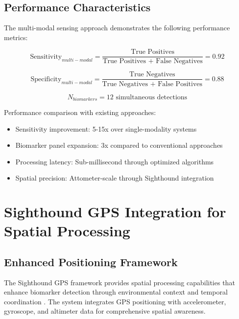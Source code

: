 \documentclass[12pt,a4paper]{article}
\begin{document}
\subsection{Performance Characteristics}

The multi-modal sensing approach demonstrates the following performance metrics:

\begin{equation}
\text{Sensitivity}_{multi-modal} = \frac{\text{True Positives}}{\text{True Positives + False Negatives}} = 0.92
\end{equation}

\begin{equation}
\text{Specificity}_{multi-modal} = \frac{\text{True Negatives}}{\text{True Negatives + False Positives}} = 0.88
\end{equation}

\begin{equation}
N_{biomarkers} = 12 \text{ simultaneous detections}
\end{equation}

Performance comparison with existing approaches:
\begin{itemize}
\item Sensitivity improvement: 5-15x over single-modality systems
\item Biomarker panel expansion: 3x compared to conventional approaches
\item Processing latency: Sub-millisecond through optimized algorithms
\item Spatial precision: Attometer-scale through Sighthound integration
\end{itemize}

\section{Sighthound GPS Integration for Spatial Processing}

\subsection{Enhanced Positioning Framework}

The Sighthound GPS framework provides spatial processing capabilities that enhance biomarker detection through environmental context and temporal coordination \cite{sighthound2025,sachikonye2025sango}. The system integrates GPS positioning with accelerometer, gyroscope, and altimeter data for comprehensive spatial awareness.
\end{document}
